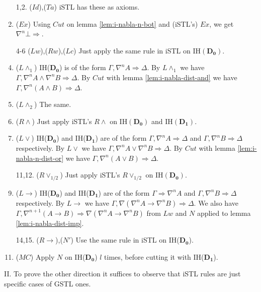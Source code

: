 \begin{enumerate}
	\item[1,2.] ($Id$),($Ta$) iSTL has these as axioms.
	\setcounter{enumi}{2}

	\item ($Ex$) Using $Cut$ on lemma \ref{lem:i-nabla-n-bot} and (iSTL's) $Ex$, we get $\nabla^n \bot \Rightarrow$.

	\item[4-6] ($Lw$),($Rw$),($Lc$) Just apply the same rule in iSTL on IH$(\mathbf{D_0})$.
	\setcounter{enumi}{6}

	\item ($L\land_1$) IH($\mathbf{D_0}$) is of the form $\Gamma , \nabla^n A \Rightarrow \Delta$. By $L\land_1$ we have $\Gamma , \nabla^n A \land \nabla^n B \Rightarrow \Delta$. By $Cut$ with lemma \ref{lem:i-nabla-dist-and} we have $\Gamma , \nabla^n (A \land B) \Rightarrow \Delta$.
	
	\item ($L\land_2$) The same.
	
	\item ($R\land$) Just apply iSTL's $R\land$ on IH$(\mathbf{D_0})$ and IH$(\mathbf{D_1})$.
	
	\item ($L\lor$) IH($\mathbf{D_0}$) and IH($\mathbf{D_1}$) are of the form $\Gamma , \nabla^n A \Rightarrow \Delta$ and $\Gamma , \nabla^n B \Rightarrow \Delta$ respectively. By $L\lor$ we have $\Gamma , \nabla^n A \lor \nabla^n B \Rightarrow \Delta$. By $Cut$ with lemma \ref{lem:i-nabla-n-dist-or} we have $\Gamma , \nabla^n (A \lor B) \Rightarrow \Delta$.
	
	\item[11,12.] ($R\lor_{1/2}$) Just apply iSTL's $R\lor_{1/2}$ on IH$(\mathbf{D_0})$.
	\setcounter{enumi}{12}
	
	\item ($L\rightarrow$) IH($\mathbf{D_0}$) and IH($\mathbf{D_1}$) are of the form $\Gamma \Rightarrow \nabla^n A$ and $\Gamma , \nabla^n B \Rightarrow \Delta$ respectively. By $L\rightarrow$ we have $\Gamma , \nabla (\nabla^n A \rightarrow \nabla^n B) \Rightarrow \Delta$. We also have $\Gamma , \nabla^{n+1} (A \rightarrow B) \Rightarrow \nabla (\nabla^n A \rightarrow \nabla^n B)$ from $Lw$ and $N$ applied to lemma \ref{lem:i-nabla-dist-imp}.
	
	\item[14,15.] ($R\rightarrow$),($N'$) Use the same rule in iSTL on IH($\mathbf{D_0}$).
	\setcounter{enumi}{15}
	
	\item ($MC$) Apply $N$ on IH($\mathbf{D_0}$) $l$ times, before cutting it with IH($\mathbf{D_1}$).
\end{enumerate}
II. To prove the other direction it suffices to observe that iSTL rules are just specific cases of GSTL ones.